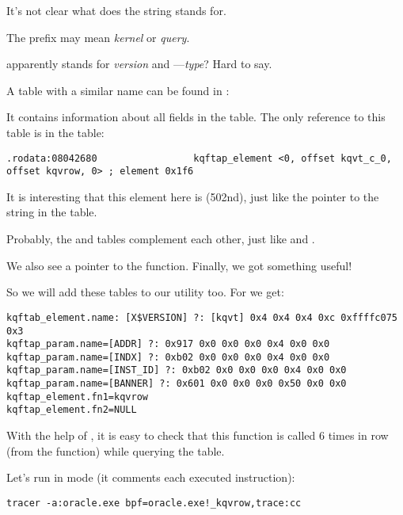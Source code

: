 It's not clear what does the  string stands for. 

The  prefix may mean \emph{kernel} or \emph{query}. 

 apparently stands for \emph{version} and ---\emph{type}? 
Hard to say.

A table with a similar name can be found in :



It contains information about all fields in the  table.
The only reference to this table is in the  table:

\begin{lstlisting}[caption=kqf.o]
.rodata:08042680                 kqftap_element <0, offset kqvt_c_0, offset kqvrow, 0> ; element 0x1f6
\end{lstlisting}

It is interesting that this element here is  (502nd), just like the pointer to the  string in 
the  table.

Probably, the  and  tables complement each other, just like  and .

We also see a pointer to the  function. Finally, we got something useful!

So we will add these tables to our \oracletables utility too. For  we get:

\begin{lstlisting}[caption=Result of \OracleTablesName]
kqftab_element.name: [X$VERSION] ?: [kqvt] 0x4 0x4 0x4 0xc 0xffffc075 0x3
kqftap_param.name=[ADDR] ?: 0x917 0x0 0x0 0x0 0x4 0x0 0x0
kqftap_param.name=[INDX] ?: 0xb02 0x0 0x0 0x0 0x4 0x0 0x0
kqftap_param.name=[INST_ID] ?: 0xb02 0x0 0x0 0x0 0x4 0x0 0x0
kqftap_param.name=[BANNER] ?: 0x601 0x0 0x0 0x0 0x50 0x0 0x0
kqftap_element.fn1=kqvrow
kqftap_element.fn2=NULL
\end{lstlisting}

With the help of \tracer, it is easy to check that this function is called 6 times in row (from the  function) while querying the  table.

Let's run \tracer in  mode (it comments each executed instruction):

\begin{lstlisting}
tracer -a:oracle.exe bpf=oracle.exe!_kqvrow,trace:cc
\end{lstlisting}

